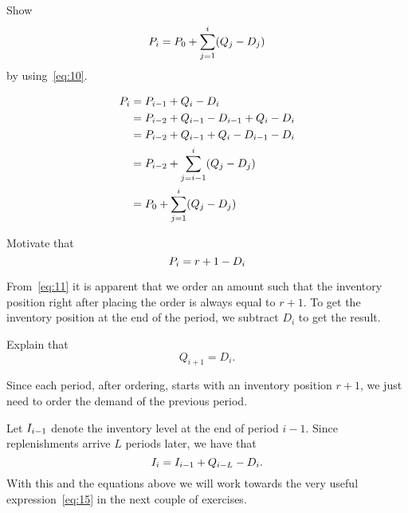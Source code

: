 \begin{exercise}
  Show 
  \begin{equation}
    P_{i}= P_0 + \sum_{j=1}^{i} (Q_j-D_j)
  \end{equation}
by using~\eqref{eq:10}.
  \begin{solution}
    \begin{align*}
    P_i
&= P_{i-1} + Q_i - D_i  \\
&= P_{i-2} + Q_{i-1} - D_{i-1} + Q_i - D_i  \\
&= P_{i-2} + Q_{i-1} +Q_i - D_{i-1} - D_i  \\
&= P_{i-2} + \sum_{j=i-1}^i (Q_{j} - D_{j}) \\
&= P_0 + \sum_{j=1}^{i} (Q_j-D_j)
    \end{align*}
  \end{solution}
\end{exercise}

\begin{exercise}
Motivate that
\begin{equation}\label{eq:9}
  P_{i} = r+1 - D_i
\end{equation}
\begin{solution}
From~\eqref{eq:11} it is apparent that we order an amount such that the inventory position right after placing the order is always equal to $r+1$. To get the inventory position at the end of the period, we subtract $D_i$ to get the result.
\end{solution}
\end{exercise}


\begin{exercise}
Explain that 
\begin{equation}\label{eq:22b}
Q_{i+1}=D_i.
\end{equation}
\begin{solution}
  Since each period, after ordering, starts with an inventory position $r+1$, we just need to order the demand of the previous period.
\end{solution}
\end{exercise}

Let $I_{i-1}$ denote the inventory level at the end of period $i-1$. Since replenishments arrive $L$ periods later, we have that
\begin{equation}\label{eq:b5}
  I_{i} = I_{i-1} + Q_{i-L} - D_i.
\end{equation}
With  this and the equations above we will work towards the very useful expression~\eqref{eq:15} in the next couple of exercises.

